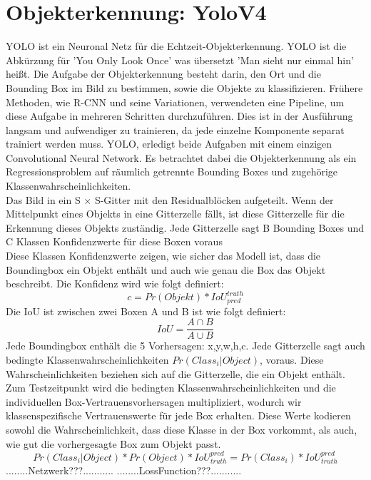 \documentclass[conference]{IEEEtran}
\begin{document}
	\section{Objekterkennung: YoloV4}
	YOLO ist ein Neuronal Netz für die Echtzeit-Objekterkennung. YOLO ist die Abkürzung für 'You Only Look Once' was übersetzt 'Man sieht nur einmal hin' heißt. Die Aufgabe der Objekterkennung besteht darin, den Ort und die Bounding Box im Bild zu bestimmen, sowie die Objekte zu klassifizieren. Frühere Methoden, wie R-CNN und seine Variationen, verwendeten eine Pipeline, um diese Aufgabe in mehreren Schritten durchzuführen. Dies ist in der Ausführung langsam und aufwendiger zu trainieren, da jede einzelne Komponente separat trainiert werden muss. YOLO, erledigt beide Aufgaben mit einem einzigen Convolutional Neural Network. Es betrachtet dabei die Objekterkennung als ein Regressionsproblem auf räumlich getrennte Bounding Boxes und zugehörige Klassenwahrscheinlichkeiten.\cite{b1}\\
	Das Bild in ein S × S-Gitter mit den Residualblöcken aufgeteilt. Wenn der Mittelpunkt eines Objekts in eine Gitterzelle fällt, ist diese Gitterzelle für die Erkennung dieses Objekts zuständig. Jede Gitterzelle sagt B Bounding Boxes und C Klassen Konfidenzwerte für diese Boxen voraus \cite{b1}\\
	Diese Klassen Konfidenzwerte zeigen, wie sicher das Modell ist, dass die Boundingbox ein Objekt enthält und auch wie genau die Box das Objekt beschreibt. Die Konfidenz wird wie folgt definiert:
	\[ c = Pr(Objekt) * IoU_{pred}^{truth} \]
	Die IoU ist zwischen zwei Boxen A und B ist wie folgt definiert:
	\[ IoU = \frac{A \cap B}{A \cup B} \]
	Jede Boundingbox enthält die 5 Vorhersagen: x,y,w,h,c.
	Jede Gitterzelle sagt auch bedingte Klassenwahrscheinlichkeiten $Pr(Class_{i}|Object)$, voraus.  Diese Wahrscheinlichkeiten beziehen sich auf die Gitterzelle, die ein Objekt enthält.
	Zum Testzeitpunkt wird die bedingten Klassenwahrscheinlichkeiten und die individuellen Box-Vertrauensvorhersagen multipliziert, wodurch wir klassenspezifische Vertrauenswerte für jede Box erhalten.  Diese Werte kodieren sowohl die Wahrscheinlichkeit, dass diese Klasse in der Box vorkommt, als auch, wie gut die vorhergesagte Box zum Objekt passt.
	\[ Pr(Class_{i}|Object)*Pr(Object)*IoU_{truth}^{pred}= Pr(Class_{i})*IoU_{truth}^{pred} \]
	........Netzwerk???...........
	........LossFunction???...........
	
\end{document}
